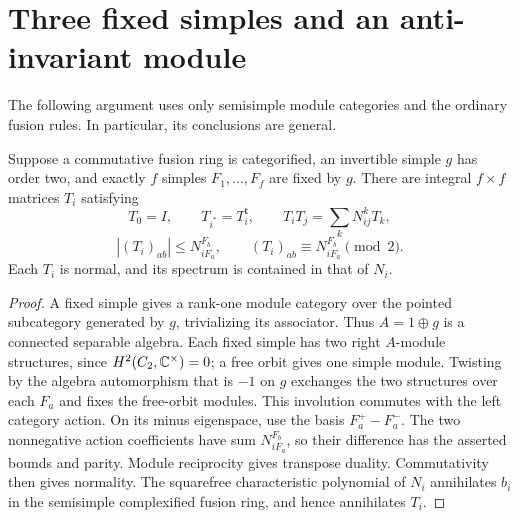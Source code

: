 \section{Three fixed simples and an anti-invariant module}
\label{sec:three-fixed}
The following argument uses only semisimple module categories and the
ordinary fusion rules. In particular, its conclusions are general.

\begin{proposition}
\label{prop:anti-module}
Suppose a commutative fusion ring is categorified, an invertible simple
$g$ has order two, and exactly $f$ simples $F_1,\ldots,F_f$ are fixed
by $g$. There are integral $f\times f$ matrices $T_i$ satisfying
\[
 T_0=I,\qquad T_{i^*}=T_i^{\mathsf t},\qquad
 T_iT_j=\sum_kN_{ij}^kT_k,
\]
\[
 |(T_i)_{ab}|\leq N_{iF_a}^{F_b},\qquad
 (T_i)_{ab}\equiv N_{iF_a}^{F_b}\pmod2.
\]
Each $T_i$ is normal, and its spectrum is contained in that of $N_i$.
\end{proposition}
\begin{proof}
A fixed simple gives a rank-one module category over the pointed
subcategory generated by $g$, trivializing its associator. Thus
$A=1\oplus g$ is a connected separable algebra. Each fixed simple has
two right $A$-module structures, since $H^2(C_2,\mathbb C^\times)=0$; a free
orbit gives one simple module. Twisting by the algebra automorphism
that is $-1$ on $g$ exchanges the two structures over each $F_a$ and
fixes the free-orbit modules. This involution commutes with the left
category action. On its minus eigenspace, use the basis
$F_a^+-F_a^-$. The two nonnegative action coefficients have sum
$N_{iF_a}^{F_b}$, so their difference has the asserted bounds and
parity. Module reciprocity gives transpose duality. Commutativity then
gives normality. The squarefree characteristic polynomial of $N_i$
annihilates $b_i$ in the semisimple complexified fusion ring, and hence
annihilates $T_i$.
\end{proof}

